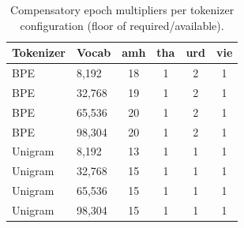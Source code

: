 \documentclass{article}
\begin{document}
\begin{table}[ht]
\centering
\caption{Compensatory epoch multipliers per tokenizer configuration (floor of required/available).}
\label{tab:fw2-epochs}
\begin{tabular}{llcccc}
\toprule
\textbf{Tokenizer} & \textbf{Vocab} & \textbf{amh} & \textbf{tha} & \textbf{urd} & \textbf{vie} \\
\midrule
BPE & 8,192 & 18 & 1 & 2 & 1 \\
BPE & 32,768 & 19 & 1 & 2 & 1 \\
BPE & 65,536 & 20 & 1 & 2 & 1 \\
BPE & 98,304 & 20 & 1 & 2 & 1 \\
\midrule
Unigram & 8,192 & 13 & 1 & 1 & 1 \\
Unigram & 32,768 & 15 & 1 & 1 & 1 \\
Unigram & 65,536 & 15 & 1 & 1 & 1 \\
Unigram & 98,304 & 15 & 1 & 1 & 1 \\
\bottomrule
\end{tabular}
\end{table}
\end{document}
